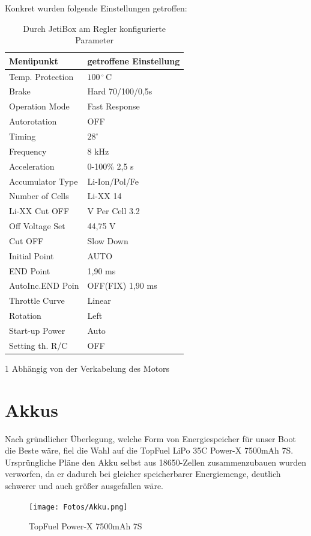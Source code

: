 Konkret wurden folgende Einstellungen getroffen:\\
\begin{table}[h]
\centering
\begin{threeparttable}
    
    \begin{tabular}{|l|l|}
    \hline
     Menüpunkt & getroffene Einstellung \\\hline
     Temp. Protection & $100\,^\circ\,\textrm{C}$\\
     Brake & Hard 70/100/0,5s\\
     Operation Mode & Fast Response\\
     Autorotation & OFF\\
     Timing & $28^\circ$\\
     Frequency & 8 kHz\\
     Acceleration & 0-100\% 2,5 s\\
     Accumulator Type & Li-Ion/Pol/Fe\\
     Number of Cells & Li-XX 14\\
     Li-XX Cut OFF & V Per Cell 3.2\\
     Off Voltage Set & 44,75 V\\
     Cut OFF & Slow Down\\
     Initial Point & AUTO\\
     END Point & 1,90 ms\\
     AutoInc.END Poin & OFF(FIX) 1,90 ms\\
     Throttle Curve & Linear\\
     Rotation & Left \tnote{1}\\
     Start-up Power & Auto\\
     Setting th. R/C & OFF\\\hline
    \end{tabular}
    \begin{tablenotes}\footnotesize 
        \item[1] Abhängig von der Verkabelung des Motors 
        \end{tablenotes}
    \end{threeparttable}
    \caption{Durch JetiBox am Regler konfigurierte Parameter}
\end{table}
\newpage


\section{Akkus}
Nach gründlicher Überlegung, welche Form von Energiespeicher für unser Boot die Beste wäre, fiel die Wahl auf die TopFuel LiPo 35C Power-X 7500mAh 7S.
Ursprüngliche Pläne den Akku selbst aus 18650-Zellen zusammenzubauen wurden verworfen, da er dadurch bei gleicher speicherbarer Energiemenge, deutlich schwerer und auch größer ausgefallen wäre.
\begin{figure}[h]
    \centering
    \texttt{[image: Fotos/Akku.png]}
    \caption{TopFuel Power-X 7500mAh 7S}
\end{figure}

